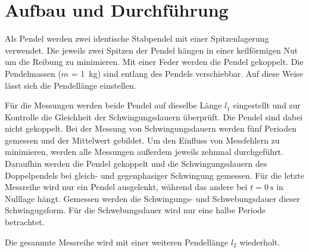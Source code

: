 \section{Aufbau und Durchführung}
\label{sec:Durchführung}

Als Pendel werden zwei identische Stabpendel mit einer
Spitzenlagerung verwendet.
Die jeweils zwei Spitzen der Pendel hängen in
einer keilförmigen Nut um die Reibung zu minimieren. Mit einer Feder werden
die Pendel gekoppelt. Die Pendelmassen ($m$ = \SI{1}{\kilo\gram})
sind entlang des Pendels verschiebbar.
Auf diese Weise lässt sich die Pendellänge einstellen.


Für die Messungen werden beide Pendel auf dieselbe Länge $l_1$
eingestellt und zur
Kontrolle die Gleichheit der Schwingungsdauern überprüft. Die Pendel
sind dabei nicht gekoppelt. Bei der Messung von Schwingungsdauern werden
fünf Perioden gemessen und der Mittelwert gebildet.
Um den Einfluss von Messfehlern
zu minimieren, werden alle Messungen außerdem jeweils zehnmal durchgeführt.
Daraufhin werden die Pendel gekoppelt und die Schwingungsdauern des
Doppelpendels bei gleich- und gegenphasiger Schwingung gemessen.
Für die letzte Messreihe wird nur ein Pendel ausgelenkt, während das andere
bei $t = \SI{0}{\second}$ in Nulllage hängt. Gemessen werden die Schwingungs- und
Schwebungsdauer dieser Schwingugsform. Für die Schwebungsdauer wird nur eine
halbe Periode betrachtet.

Die gesammte Messreihe wird mit einer weiteren Pendellänge $l_2$ wiederholt.
